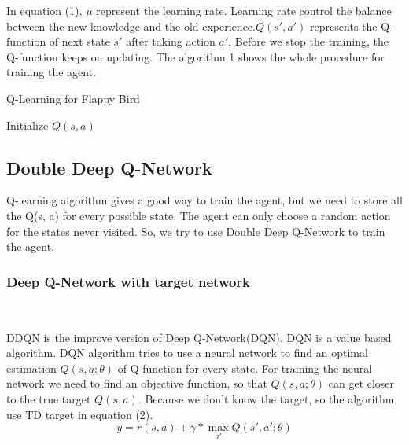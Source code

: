 \documentclass[conference,compsoc]{IEEEtran}
\begin{document}
In equation (1), ${\mu}$ represent the learning rate. Learning rate control the balance between the new knowledge and the old experience.${Q(s',a')}$ represents the Q-function of next state ${s'}$ after taking action ${a'}$. Before we stop the training, the Q-function keeps on updating. The algorithm 1 shows the whole procedure for training the agent.

\begin{algorithm}
\caption{Q-Learning for Flappy Bird}
\label{alg:A1}
Initialize ${Q(s,a)}$\\
\end{algorithm}

\subsection{Double Deep Q-Network}
Q-learning algorithm gives a good way to train the agent, but we need to store all the Q(s, a) for every possible state. The agent can only choose a random action for the states never visited. So, we try to use Double Deep Q-Network to train the agent.
\subsubsection{Deep Q-Network with target network}
 
 \

\indent 
DDQN is the improve version of Deep Q-Network(DQN). DQN is a value based algorithm. DQN algorithm tries to use a neural network to find an optimal estimation ${Q(s, a; \theta)}$ of Q-function for every state. For training the neural network we need to find an objective function, so that ${Q(s, a; \theta)}$ can get closer to the true target ${Q(s, a)}$. Because we don’t know the target, so the algorithm use TD target in equation (2).
\begin{equation}
y=r(s,a) + \gamma * \mathop{max}_{a'}Q(s',a';\theta)
\end{equation}
\end{document}
